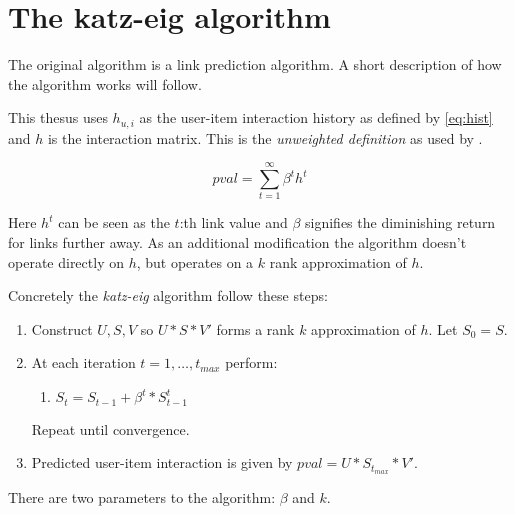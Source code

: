 \section{The katz-eig algorithm}\label{sec:katzeig}

The original algorithm \cite{katz1953new} is a link prediction algorithm. A short description of how the algorithm works will follow.


This thesus uses $h_{u, i}$ as the user-item interaction history as defined by \ref{eq:hist} and $h$ is the interaction matrix. This is the \textit{unweighted definition} as used by \cite{liben2007link}.



\begin{equation}
    \mathit{pval} = \sum_{t=1}^{\infty} \beta^t h^t
\end{equation}

Here $h^t$ can be seen as the $t$:th link value and $\beta$ signifies the diminishing return for links further away.  As an additional modification the algorithm doesn't operate directly on $h$, but operates on a $k$ rank approximation of $h$.


Concretely the \textit{katz-eig} algorithm follow these steps:

\begin{enumerate}
    \item Construct $U, S, V$ so $U * S * V'$ forms a rank $k$ approximation of $h$. Let $S_0 = S$.

    \item At each iteration $t = 1, \ldots, t_{max}$ perform:

        \begin{enumerate}
            \item $S_t = S_{t - 1} + \beta^t * S_{t - 1}^t$
        \end{enumerate}

        Repeat until convergence.

    \item Predicted user-item interaction is given by $\mathit{pval} = U * S_{t_{max}} * V'$.

\end{enumerate}

There are two parameters to the algorithm: $\beta$ and $k$.

